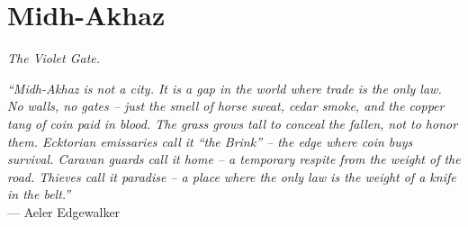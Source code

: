 \documentclass[12pt,oneside]{book}
\begin{document}


\newpage

\chapter{Midh-Akhaz}
\emph{The Violet Gate.}

\noindent
\textit{``Midh-Akhaz is not a city. It is a gap in the world where trade is the only law. No walls, no gates -- just the smell of horse sweat, cedar smoke, and the copper tang of coin paid in blood. The grass grows tall to conceal the fallen, not to honor them. Ecktorian emissaries call it ``the Brink'' -- the edge where coin buys survival. Caravan guards call it home -- a temporary respite from the weight of the road. Thieves call it paradise -- a place where the only law is the weight of a knife in the belt.''} \\
--- Aeler Edgewalker
\end{document}
